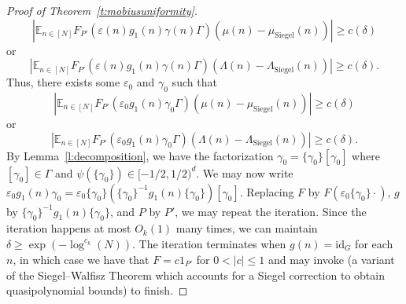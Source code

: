 \documentclass[11pt, a4paper]{amsart}
\theoremstyle{plain}
\theoremstyle{plain}
\theoremstyle{definition}
\theoremstyle{remark}
\numberwithin{equation}{section}
\numberwithin{lemma}{section}
\numberwithin{proposition}{section}
\numberwithin{corollary}{section}
\numberwithin{definition}{section}
\numberwithin{claim}{section}
\begin{document}
\begin{proof}[Proof of Theorem~\ref{t:mobiusuniformity}]
$$|\mathbb{E}_{n \in [N]} F_{P'}(\varepsilon(n)g_1(n)\gamma(n)\Gamma)(\mu(n) - \mu_{\mathrm{Siegel}}(n))| \ge c(\delta)$$
or
$$|\mathbb{E}_{n \in [N]} F_{P'}(\varepsilon(n)g_1(n)\gamma(n)\Gamma)(\Lambda(n) - \Lambda_{\mathrm{Siegel}}(n))| \ge c(\delta).$$
Thus, there exists some $\varepsilon_0$ and $\gamma_0$ such that
$$|\mathbb{E}_{n \in [N]} F_{P'}(\varepsilon_0 g_1(n)\gamma_0\Gamma)(\mu(n) - \mu_{\mathrm{Siegel}}(n))| \ge c(\delta)$$
or
$$|\mathbb{E}_{n \in [N]} F_{P'}(\varepsilon_0 g_1(n)\gamma_0\Gamma)(\Lambda(n) - \Lambda_{\mathrm{Siegel}}(n))| \ge c(\delta).$$
By Lemma~\ref{l:decomposition}, we have the factorization $\gamma_0 = \{\gamma_0\}[\gamma_0]$ where $[\gamma_0] \in \Gamma$ and $\psi(\{\gamma_0\}) \in [-1/2, 1/2)^d$. We may now write $\varepsilon_0 g_1(n)\gamma_0 = \varepsilon_0\{\gamma_0\} (\{\gamma_0\}^{-1}g_1(n)\{\gamma_0\})[\gamma_0]$. Replacing $F$ by $F(\varepsilon_0\{\gamma_0\} \cdot)$, $g$ by $\{\gamma_0\}^{-1}g_1(n)\{\gamma_0\}$, and $P$ by $P'$, we may repeat the iteration. Since the iteration happens at most $O_k(1)$ many times, we can maintain $\delta \ge \exp(-\log^{c_k}(N))$. The iteration terminates when $g(n) = \mathrm{id}_G$ for each $n$, in which case we have that $F = c1_{P'}$ for $0 < |c| \le 1$ and may invoke \cite[Proposition~2.2]{TT21} (a variant of the Siegel--Walfisz Theorem which accounts for a Siegel correction to obtain quasipolynomial bounds)  to finish.    
\end{proof}
\end{document}

